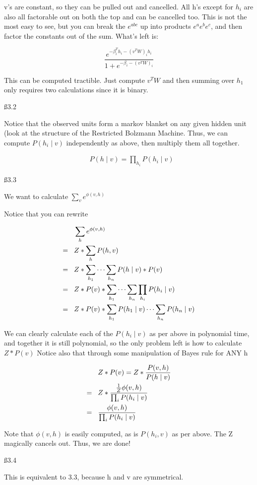 v's are constant, so they can be pulled out and cancelled. All h's except for $h_i$ are also all factorable out on both the top and can be cancelled too. This is not the most easy to see, but you can break the $e^{abc}$ up into products $e^ae^be^c$, and then factor the constants out of the sum. What's left is:

\[
\frac { e^{-\beta^T_ih_i-(v^TW)_ih_i}}{1 + e^{-\beta_i-(v^TW)_i}}
\]

This can be computed tractible. Just compute $v^TW$ and then summing over $h_1$ only requires two calculations since it is binary.

\ss{3.2}

Notice that the observed units form a markov blanket on any given hidden unit (look at the structure of the Restricted Bolzmann Machine. Thus, we can compute $ P (h_i \mid v) $ independently as above, then multiply them all together.

\begin{align*}
& P(h \mid v) = \prod_{h_i} P(h_i \mid v)
\end{align*}

\ss{3.3}

We want to calculate $\sum_v e^{\phi(v,h)}$

Notice that you can rewrite

\begin{align*}
& \sum_h e^{\phi(v,h)}
\\ = \hspace{3 mm} & Z * \sum_h P(h,v) \\ = \hspace{3 mm} & Z* \sum_{h_1} \dots \sum_{h_n} P(h \mid v) * P(v) \\ = \hspace{3 mm} & Z* P(v) * \sum_{h_1} \dots \sum_{h_n} \prod_{h_i} P(h_i \mid v)
\\ = \hspace{3 mm} & Z* P(v) * \sum_{h_1} P(h_1 \mid v) \dots \sum_{h_n} P(h_n \mid v) 
\end{align*}

We can clearly calculate each of the $P(h_i \mid v)$ as per above in polynomial time, and together it is still polynomial, so the only problem left is how to calculate $Z* P(v)$
Notice also that through some manipulation of Bayes rule for ANY h

\begin{align*}
& Z*P(v) = Z*\frac{P(v,h)}{P(h \mid v)}
\\ = \hspace{3 mm} & Z* \frac{ \frac{1}{Z}\phi(v,h)}{\prod_i P(h_i \mid v)} \\ = \hspace{3 mm} & \frac{ \phi(v,h)}{\prod_i P(h_i \mid v)}
\end{align*}

Note that $\phi(v,h)$ is easily computed, as is $P(h_i, v)$ as per above. The Z magically cancels out. Thus, we are done!

\ss{3.4}

This is equivalent to 3.3, because h and v are symmetrical.

